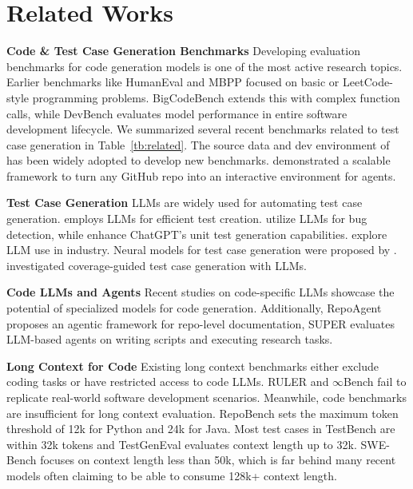 \section{Related Works}
\textbf{Code \& Test Case Generation Benchmarks}\quad
\iffalse The development of benchmarks for evaluating code generation models has been active. \fi Developing evaluation benchmarks for code generation models is one of the most active research topics.
Earlier benchmarks like HumanEval \cite{chen2021evaluating} and MBPP \cite{austin2021program} focused on basic or LeetCode-style programming problems. BigCodeBench \cite{zhuo2024bigcodebench} extends this with complex function calls, while DevBench \cite{devbench} evaluates model performance in entire software development lifecycle. 
We summarized several recent benchmarks related to test case generation in Table~\ref{tb:related}. The source data and dev environment of \citet{swebench} has been widely adopted to develop new benchmarks. \citet{r2e} demonstrated a scalable framework to turn any GitHub repo into an interactive environment for agents.


\textbf{Test Case Generation}\quad
LLMs are widely used for automating test case generation. \citet{chatunitest} employs LLMs for efficient test creation. \citet{liu2024llm} utilize LLMs for bug detection, while \citet{tang2024chatgpt,yuan2024evaluating} enhance ChatGPT's unit test generation capabilities. \citet{alshahwan2024automated} explore LLM use in industry. Neural models for test case generation were proposed by \citet{tufano2020unit,nie2023learning}. \citet{ryan2024code} investigated coverage-guided test case generation with LLMs.

\textbf{Code LLMs and Agents}\quad
Recent studies on code-specific LLMs \cite{codellama,starcoder2,hui2024qwen2} showcase the potential of specialized models for code generation. \iffalse The StarCoder 2 \cite{starcoder2} and open code models based on GEMMA \cite{team2024codegemma} show the evolution of LLMs tailored for programming tasks. \fi Additionally, RepoAgent \cite{luo2024repoagent} proposes an agentic framework for repo-level documentation, SUPER \cite{bogin2024superevaluatingagentssetting} evaluates LLM-based agents on writing scripts and executing research tasks.

\textbf{Long Context for Code}\quad
Existing long context benchmarks either exclude coding tasks or have restricted access to code LLMs. RULER \cite{hsieh2024ruler} and $\infty$Bench \cite{zhang-etal-2024-bench} fail to replicate real-world software development scenarios. Meanwhile, code benchmarks are insufficient for long context evaluation. RepoBench \cite{repobench} sets the maximum token threshold of 12k for Python and 24k for Java. Most test cases in TestBench \cite{testbench} are within 32k tokens and TestGenEval \cite{jain2024testgenevalrealworldunit} evaluates context length up to 32k. SWE-Bench \cite{swebench} focuses on context length less than 50k, which is far behind many recent models often claiming to be able to consume 128k+ context length.




